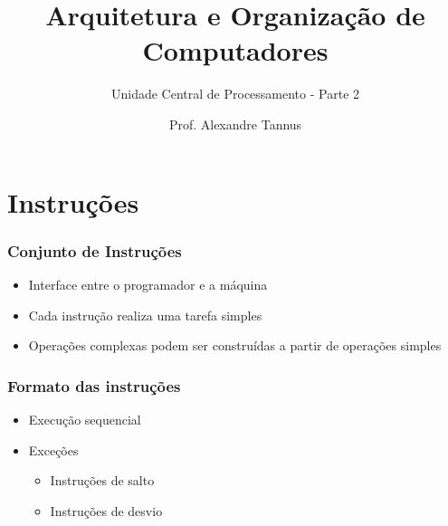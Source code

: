 \documentclass[aspectratio=169,
				xcolor=table]{beamer}
\title[]{Arquitetura e Organização de Computadores}
\subtitle[]{Unidade Central de Processamento - Parte 2}
\author[]{Prof. Alexandre Tannus}
\date{}
\begin{document}
	\begin{frame}
		\titlepage
	\end{frame}

	\begin{frame}
		\tableofcontents		
	\end{frame}	
		
	\section{Instruções}

	\begin{frame}
		\frametitle{Conjunto de Instruções}
		\begin{itemize}
			\item Interface entre o programador e a máquina
			\vspace{1em}
			\item Cada instrução realiza uma tarefa simples
			\vspace{1em}
			\item Operações complexas podem ser construídas a partir de operações simples
		\end{itemize}
	\end{frame}
	
	
	\begin{frame}
		\frametitle{Formato das instruções}
		\begin{itemize}
			\item Execução sequencial
			\vspace{1em}
			\item Exceções
			\begin{itemize}
				\item Instruções de salto
				\item Instruções de desvio
			\end{itemize}
		\end{itemize}
	\end{frame}
	
\end{document}
